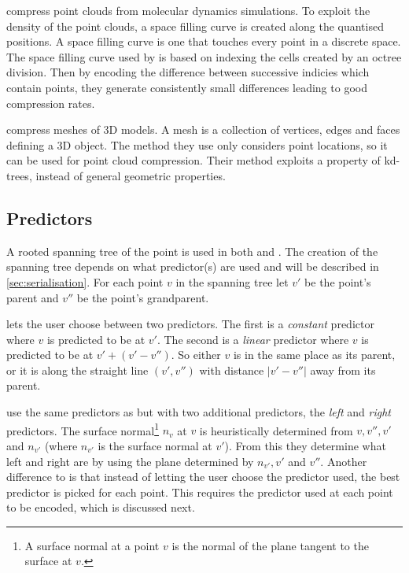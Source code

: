 \documentclass[a4paper]{report}
\begin{document}
\citet{omeltchenko2000sls} compress point clouds from molecular dynamics
simulations. To exploit the density of the point clouds, a space filling curve
is created along the quantised positions. A space filling curve is one that
touches every point in a discrete space. The space filling curve used by
\citet{omeltchenko2000sls} is based on indexing the cells created by an octree
division. Then by encoding the difference between successive indicies which
contain points, they generate consistently small differences leading to good
compression rates.

\citet{devillers2000gci} compress meshes of 3D models. A mesh is a collection
of vertices, edges and faces defining a 3D object. The method they use only
considers point locations, so it can be used for point cloud
compression. Their method exploits a property of kd-trees, instead of general
geometric properties.


\subsection{Predictors}

A rooted spanning tree of the point is used in both \citet{gumholdcomp} and
\citet{merrycomp}. The creation of the spanning tree depends on what
predictor(s) are used and will be described in \ref{sec:serialisation}. For
each point $v$ in the spanning tree let $v'$ be the point's parent and $v''$
be the point's grandparent.

\citet{gumholdcomp} lets the user choose between two predictors. The first is
a \emph{constant} predictor where $v$ is predicted to be at $v'$. The second
is a \emph{linear} predictor where $v$ is predicted to be at $v' + (v' -
v'')$. So either $v$ is in the same place as its parent, or it is along the
straight line $(v', v'')$ with distance $|v'-v''|$ away from its parent.

\citet{merrycomp} use the same predictors as \citet{gumholdcomp} but with two
additional predictors, the \emph{left} and \emph{right} predictors. The
surface normal\footnote{A surface normal at a point $v$ is the normal of the
  plane tangent to the surface at $v$.} $n_v$ at $v$ is heuristically
determined from $v, v'', v'$ and $n_{v'}$ (where $n_{v'}$ is the surface
normal at $v'$). From this they determine what left and right are by using the
plane determined by $n_{v'}, v'$ and $v''$. Another difference to
\citet{gumholdcomp} is that instead of letting the user choose the
predictor used, the best predictor is picked for each point. This requires the
predictor used at each point to be encoded, which is discussed next.
\end{document}
